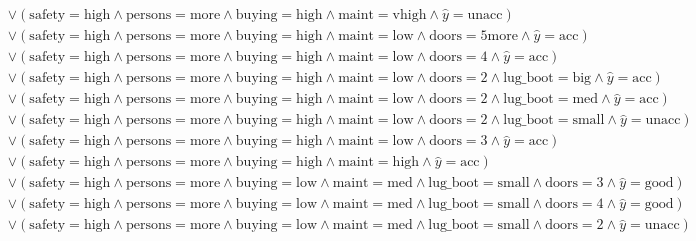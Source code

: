 \begin{scriptsize}
\[\begin{aligned}
  \\ & \lor (\text{safety}=\text{high} \land \text{persons}=\text{more} \land \text{buying}=\text{high} \land \text{maint}=\text{vhigh} \land \hat{y}=\text{unacc})
  \\ & \lor (\text{safety}=\text{high} \land \text{persons}=\text{more} \land \text{buying}=\text{high} \land \text{maint}=\text{low} \land \text{doors}=\text{5more} \land \hat{y}=\text{acc})
  \\ & \lor (\text{safety}=\text{high} \land \text{persons}=\text{more} \land \text{buying}=\text{high} \land \text{maint}=\text{low} \land \text{doors}=\text{4} \land \hat{y}=\text{acc})
  \\ & \lor (\text{safety}=\text{high} \land \text{persons}=\text{more} \land \text{buying}=\text{high} \land \text{maint}=\text{low} \land \text{doors}=\text{2} \land \text{lug_boot}=\text{big} \land \hat{y}=\text{acc})
  \\ & \lor (\text{safety}=\text{high} \land \text{persons}=\text{more} \land \text{buying}=\text{high} \land \text{maint}=\text{low} \land \text{doors}=\text{2} \land \text{lug_boot}=\text{med} \land \hat{y}=\text{acc})
  \\ & \lor (\text{safety}=\text{high} \land \text{persons}=\text{more} \land \text{buying}=\text{high} \land \text{maint}=\text{low} \land \text{doors}=\text{2} \land \text{lug_boot}=\text{small} \land \hat{y}=\text{unacc})
  \\ & \lor (\text{safety}=\text{high} \land \text{persons}=\text{more} \land \text{buying}=\text{high} \land \text{maint}=\text{low} \land \text{doors}=\text{3} \land \hat{y}=\text{acc})
  \\ & \lor (\text{safety}=\text{high} \land \text{persons}=\text{more} \land \text{buying}=\text{high} \land \text{maint}=\text{high} \land \hat{y}=\text{acc})
  \\ & \lor (\text{safety}=\text{high} \land \text{persons}=\text{more} \land \text{buying}=\text{low} \land \text{maint}=\text{med} \land \text{lug_boot}=\text{small} \land \text{doors}=\text{3} \land \hat{y}=\text{good})
  \\ & \lor (\text{safety}=\text{high} \land \text{persons}=\text{more} \land \text{buying}=\text{low} \land \text{maint}=\text{med} \land \text{lug_boot}=\text{small} \land \text{doors}=\text{4} \land \hat{y}=\text{good})
  \\ & \lor (\text{safety}=\text{high} \land \text{persons}=\text{more} \land \text{buying}=\text{low} \land \text{maint}=\text{med} \land \text{lug_boot}=\text{small} \land \text{doors}=\text{2} \land \hat{y}=\text{unacc})

\end{aligned}\]
\end{scriptsize}
